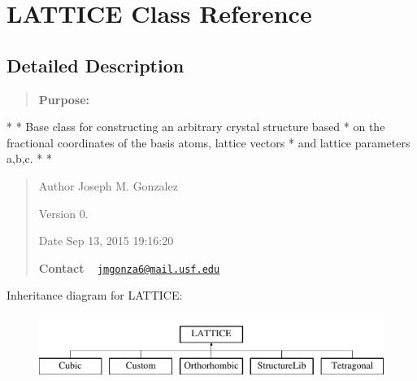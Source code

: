 \hypertarget{class_l_a_t_t_i_c_e}{}\section{L\+A\+T\+T\+I\+C\+E Class Reference}
\label{class_l_a_t_t_i_c_e}


\subsection{Detailed Description}
\begin{quote}


{\bfseries Purpose\+:} 

\end{quote}
\begin{DoxyVerb}*
*  Base class for constructing an arbitrary crystal structure based 
*  on the fractional coordinates of the basis atoms, lattice vectors
*  and lattice parameters a,b,c.
*
* \end{DoxyVerb}
 \begin{quote}
\begin{DoxyAuthor}{Author}
Joseph M. Gonzalez
\end{DoxyAuthor}
\begin{DoxyVersion}{Version}
0.
\end{DoxyVersion}
\begin{DoxyDate}{Date}
Sep 13, 2015 19\+:16\+:20
\end{DoxyDate}
{\bfseries Contact} ~\newline
 \href{mailto:jmgonza6@mail.usf.edu}{\tt jmgonza6@mail.\+usf.\+edu}\end{quote}
Inheritance diagram for L\+A\+T\+T\+I\+C\+E\+:\begin{figure}[H]
\begin{center}
\leavevmode
\includegraphics[height=2.000000cm]{class_l_a_t_t_i_c_e}
\end{center}
\end{figure}
